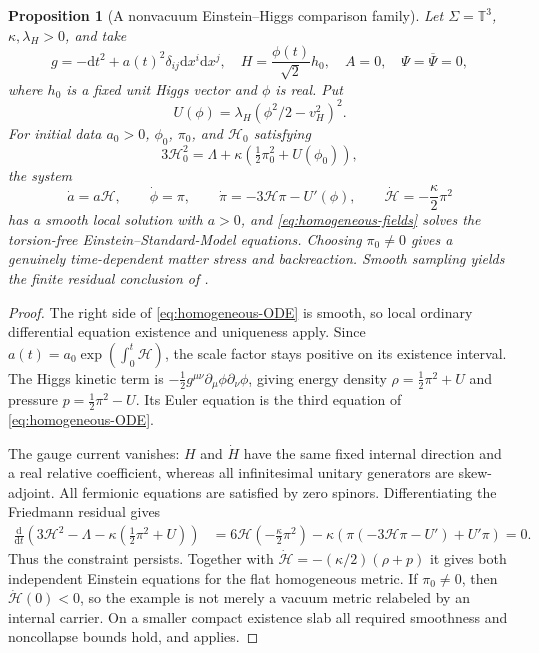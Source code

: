\documentclass[11pt]{article}
\numberwithin{equation}{section}
\newtheorem{proposition}[proposition]{Proposition}
\theoremstyle{definition}
\theoremstyle{remark}
\newcommand{\dd}{\mathrm d}
\newcommand{\bPsi}{\overline\Psi}
\begin{document}
\begin{proposition}[A nonvacuum Einstein--Higgs comparison family]
\label{prop:homogeneous}
Let $\Sigma=\mathbb T^3$, $\kappa,\lambda_H>0$, and take
\begin{equation}
 g=-\dd t^2+a(t)^2\delta_{ij}\dd x^i\dd x^j,
 \quad H=\frac{\phi(t)}{\sqrt2}h_0,
 \quad A=0,\quad\Psi=\bPsi=0,
 \label{eq:homogeneous-fields}
\end{equation}
where $h_0$ is a fixed unit Higgs vector and $\phi$ is real. Put
\[
 U(\phi)=\lambda_H(\phi^2/2-v_H^2)^2.
\]
For initial data $a_0>0$, $\phi_0$, $\pi_0$, and $\mathcal H_0$ satisfying
\begin{equation}
 3\mathcal H_0^2=\Lambda+\kappa\left(\tfrac12\pi_0^2+U(\phi_0)\right),
 \label{eq:Friedmann-initial}
\end{equation}
the system
\begin{equation}
 \dot a=a\mathcal H,\qquad
 \dot\phi=\pi,\qquad
 \dot\pi=-3\mathcal H\pi-U'(\phi),\qquad
 \dot{\mathcal H}=-\frac\kappa2\pi^2
 \label{eq:homogeneous-ODE}
\end{equation}
has a smooth local solution with $a>0$, and \eqref{eq:homogeneous-fields} solves the torsion-free Einstein--Standard-Model equations. Choosing $\pi_0\ne0$ gives a genuinely time-dependent matter stress and backreaction. Smooth sampling yields the finite residual conclusion of .
\end{proposition}
\begin{proof}
The right side of \eqref{eq:homogeneous-ODE} is smooth, so local ordinary differential equation existence and uniqueness apply. Since $a(t)=a_0\exp(\int_0^t\mathcal H)$, the scale factor stays positive on its existence interval. The Higgs kinetic term is $-\tfrac12g^{\mu\nu}\partial_\mu\phi\partial_\nu\phi$, giving energy density $\rho=\tfrac12\pi^2+U$ and pressure $p=\tfrac12\pi^2-U$. Its Euler equation is the third equation of \eqref{eq:homogeneous-ODE}.

The gauge current vanishes: $H$ and $\dot H$ have the same fixed internal direction and a real relative coefficient, whereas all infinitesimal unitary generators are skew-adjoint. All fermionic equations are satisfied by zero spinors. Differentiating the Friedmann residual gives
\begin{align*}
 \frac{\dd}{\dd t}\left(3\mathcal H^2-\Lambda
             -\kappa(\tfrac12\pi^2+U)\right)
 &=6\mathcal H\left(-\tfrac\kappa2\pi^2\right)
   -\kappa\left(\pi(-3\mathcal H\pi-U')+U'\pi\right)=0.
\end{align*}
Thus the constraint persists. Together with $\dot{\mathcal H}=-(\kappa/2)(\rho+p)$ it gives both independent Einstein equations for the flat homogeneous metric. If $\pi_0\ne0$, then $\dot{\mathcal H}(0)<0$, so the example is not merely a vacuum metric relabeled by an internal carrier. On a smaller compact existence slab all required smoothness and noncollapse bounds hold, and  applies.
\end{proof}
\end{document}
